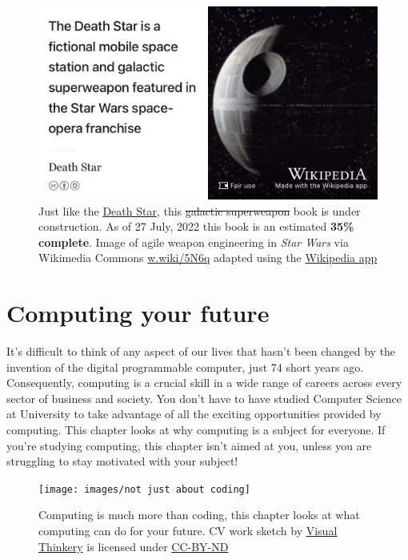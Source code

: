 \documentclass[
]{book}
\begin{document}
\begin{figure}

{\centering \includegraphics[width=0.99\linewidth]{images/DeathStar2} 

}

\caption{Just like the \href{https://en.wikipedia.org/wiki/Death_Star}{Death Star}, this \sout{galactic superweapon} book is under construction. As of 27 July, 2022 this book is an estimated \textbf{35\% complete}. Image of agile weapon engineering in \emph{Star Wars} via Wikimedia Commons \href{https://w.wiki/5N6q}{w.wiki/5N6q} adapted using the \href{https://apps.apple.com/gb/app/wikipedia/id324715238}{Wikipedia app}}\label{fig:deathstar2-fig}
\end{figure}

\hypertarget{computing}{%
\chapter{Computing your future}\label{computing}}

It's difficult to think of any aspect of our lives that hasn't been changed by the invention of the digital programmable computer, just 74 short years ago. Consequently, computing is a crucial skill in a wide range of careers across every sector of business and society. You don't have to have studied Computer Science at University to take advantage of all the exciting opportunities provided by computing. This chapter looks at why computing is a subject for everyone. If you're studying computing, this chapter isn't aimed at you, unless you are struggling to stay motivated with your subject! 👨🏿‍💻👨‍💻👩🏽‍💻👩‍💻👨🏿‍💻

\begin{figure}

{\centering \texttt{[image: images/not just about coding]} 

}

\caption{Computing is much more than coding, this chapter looks at what computing can do for your future. CV work sketch by \href{https://visualthinkery.com}{Visual Thinkery} is licensed under \href{https://creativecommons.org/licenses/by-nd/4.0/}{CC-BY-ND}}\label{fig:not-coding-fig}
\end{figure}
\end{document}
